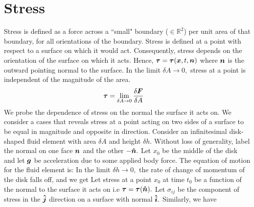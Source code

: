\section{Stress}
Stress is defined as a force across a ``small" boundary ($\in\mathbb{R}^2$) per unit area of that boundary, for all orientations of the boundary. Stress is defined at a point with respect to a surface on which it would act. Consequently, stress depends on the orientation of the surface on which it acts. Hence, $\boldsymbol{\tau} = \boldsymbol{\tau}(\boldsymbol{x},t,\boldsymbol{n})$ where $\boldsymbol{n}$ is the outward pointing normal to the surface. In the limit $\delta A\rightarrow 0,$ stress at a point is independent of the magnitude of the area.
\begin{equation}
\begin{split}
    \boldsymbol{\tau} &= \lim_{\delta A\rightarrow 0} \dfrac{\delta \boldsymbol{F}}{\delta A}
\end{split}
\end{equation}
We probe the dependence of stress on the normal the surface it acts on. We consider a cases that reveals stress at a point acting on two sides of a surface to be equal in magnitude and opposite in direction.
Consider an infinitesimal disk-shaped fluid element with area $\delta A$ and height $\delta h.$ Without loss of generality, label the normal on one face $\boldsymbol{n}$ and the other $-\boldsymbol{\hat{n}}.$ Let $x_0$ be the middle of the disk and let $\boldsymbol{g}$ be acceleration due to some applied body force. The equation of motion for the fluid element is:
In the limit $\delta h\rightarrow 0,$ the rate of change of momentum of the disk falls off, and we get
Let stress at a point $x_0$ at time $t_0$ be a function of the normal to the surface it acts on i.e $\boldsymbol{\tau}=\boldsymbol{\tau}(\boldsymbol{\hat{n}}).$  Let $\sigma_{ij}$ be the component of stress in the $\boldsymbol{\hat{j}}$ direction on a surface with normal $\boldsymbol{\hat{i}}.$ Similarly, we have
